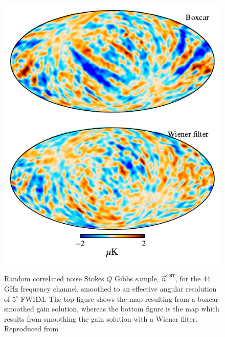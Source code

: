 \documentclass[twocolumn]{aa}
\newcommand{\n}[0]{\vec{n}}
\begin{document}
\begin{figure}[t]
  \center
  \includegraphics[width=\linewidth]{figs/ncorr_Q_5deg_boxcar.pdf}\\\vspace*{-3mm}
  \includegraphics[width=\linewidth]{figs/ncorr_Q_5deg_wiener.pdf}
  \caption{Random correlated noise Stokes $Q$ Gibbs sample,
    $\n^{\mathrm{corr}}$, for the 44\,GHz frequency channel, smoothed
    to an effective angular resolution of $5^{\circ}$ FWHM. The top
    figure shows the map resulting from a boxcar smoothed gain solution,
    whereas the bottom figure is the map which results from smoothing
    the gain solution with a Wiener filter. Reproduced from \citet{bp07}  }\label{fig:corrstripes}
\end{figure}
\end{document}
